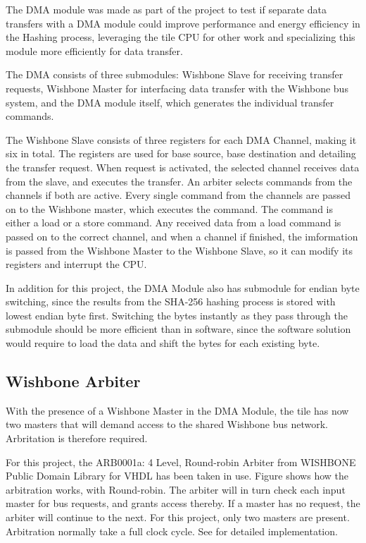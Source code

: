 The DMA module was made as part of the project to test if separate data transfers with a DMA module could improve performance and energy efficiency in the Hashing process, leveraging the tile CPU for other work and specializing this module more efficiently for data transfer.

The DMA consists of three submodules: Wishbone Slave for receiving transfer requests, Wishbone Master for interfacing data transfer with the Wishbone bus system, and the DMA module itself, which generates the individual transfer commands.

The Wishbone Slave consists of three registers for each DMA Channel, making it six in total.
The registers are used for base source, base destination and detailing the transfer request.
When request is activated, the selected channel receives data from the slave, and executes the transfer.
An arbiter selects commands from the channels if both are active.
Every single command from the channels are passed on to the Wishbone master, which executes the command.
The command is either a load or a store command.
Any received data from a load command is passed on to the correct channel, and when a channel if finished, the imformation is passed from the Wishbone Master to the Wishbone Slave, so it can modify its registers and interrupt the CPU. 

In addition for this project, the DMA Module also has submodule for endian byte switching, since the results from the SHA-256 hashing process is stored with lowest endian byte first.
Switching the bytes instantly as they pass through the submodule should be more efficient than in software, since the software solution would require to load the data and shift the bytes for each existing byte.

\subsection{Wishbone Arbiter}
With the presence of a Wishbone Master in the DMA Module, the tile has now two masters that will demand access to the shared Wishbone bus network. 
Arbritation is therefore required.

For this project, the ARB0001a: 4 Level, Round-robin Arbiter from WISHBONE Public Domain Library for VHDL has been taken in use.
Figure \cite{fig:WBArbiter} shows how the arbitration works, with Round-robin.
The arbiter will in turn check each input master for bus requests, and grants access thereby.
If a master has no request, the arbiter will continue to the next.
For this project, only two masters are present.
Arbitration normally take a full clock cycle.
See \cite{WBLibrary} for detailed implementation.

